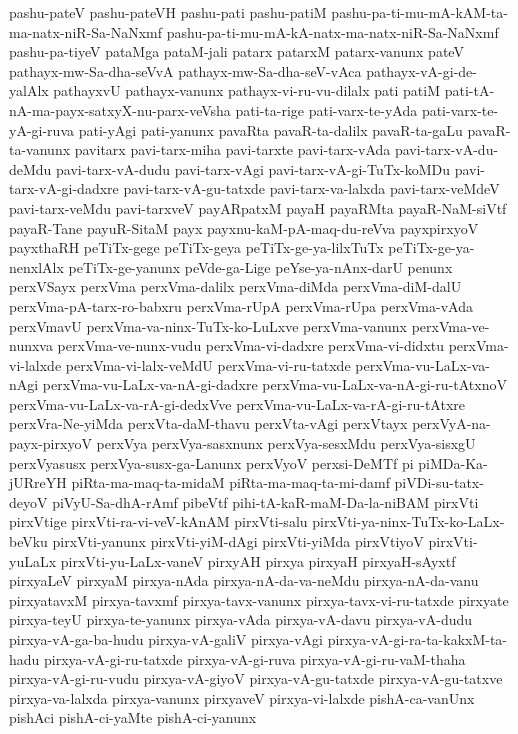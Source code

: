 {pashu-pateV
pashu-pateVH
pashu-pati
pashu-patiM
pashu-pa-ti-mu-mA-kAM-ta-ma-natx-niR-Sa-NaNxmf
pashu-pa-ti-mu-mA-kA-natx-ma-natx-niR-Sa-NaNxmf
pashu-pa-tiyeV
pataMga
pataM-jali
patarx
patarxM
patarx-vanunx
pateV
pathayx-mw-Sa-dha-seVvA
pathayx-mw-Sa-dha-seV-vAca
pathayx-vA-gi-de-yalAlx
pathayxvU
pathayx-vanunx
pathayx-vi-ru-vu-dilalx
pati
patiM
pati-tA-nA-ma-payx-satxyX-nu-parx-veVsha
pati-ta-rige
pati-varx-te-yAda
pati-varx-te-yA-gi-ruva
pati-yAgi
pati-yanunx
pavaRta
pavaR-ta-dalilx
pavaR-ta-gaLu
pavaR-ta-vanunx
pavitarx
pavi-tarx-miha
pavi-tarxte
pavi-tarx-vAda
pavi-tarx-vA-du-deMdu
pavi-tarx-vA-dudu
pavi-tarx-vAgi
pavi-tarx-vA-gi-TuTx-koMDu
pavi-tarx-vA-gi-dadxre
pavi-tarx-vA-gu-tatxde
pavi-tarx-va-lalxda
pavi-tarx-veMdeV
pavi-tarx-veMdu
pavi-tarxveV
payARpatxM
payaH
payaRMta
payaR-NaM-siVtf
payaR-Tane
payuR-SitaM
payx
payxnu-kaM-pA-maq-du-reVva
payxpirxyoV
payxthaRH
peTiTx-gege
peTiTx-geya
peTiTx-ge-ya-lilxTuTx
peTiTx-ge-ya-nenxlAlx
peTiTx-ge-yanunx
peVde-ga-Lige
peYse-ya-nAnx-darU
penunx
perxVSayx
perxVma
perxVma-dalilx
perxVma-diMda
perxVma-diM-dalU
perxVma-pA-tarx-ro-babxru
perxVma-rUpA
perxVma-rUpa
perxVma-vAda
perxVmavU
perxVma-va-ninx-TuTx-ko-LuLxve
perxVma-vanunx
perxVma-ve-nunxva
perxVma-ve-nunx-vudu
perxVma-vi-dadxre
perxVma-vi-didxtu
perxVma-vi-lalxde
perxVma-vi-lalx-veMdU
perxVma-vi-ru-tatxde
perxVma-vu-LaLx-va-nAgi
perxVma-vu-LaLx-va-nA-gi-dadxre
perxVma-vu-LaLx-va-nA-gi-ru-tAtxnoV
perxVma-vu-LaLx-va-rA-gi-dedxVve
perxVma-vu-LaLx-va-rA-gi-ru-tAtxre
perxVra-Ne-yiMda
perxVta-daM-thavu
perxVta-vAgi
perxVtayx
perxVyA-na-payx-pirxyoV
perxVya
perxVya-sasxnunx
perxVya-sesxMdu
perxVya-sisxgU
perxVyasusx
perxVya-susx-ga-Lanunx
perxVyoV
perxsi-DeMTf
pi
piMDa-Ka-jURreYH
piRta-ma-maq-ta-midaM
piRta-ma-maq-ta-mi-damf
piVDi-su-tatx-deyoV
piVyU-Sa-dhA-rAmf
pibeVtf
pihi-tA-kaR-maM-Da-la-niBAM
pirxVti
pirxVtige
pirxVti-ra-vi-veV-kAnAM
pirxVti-salu
pirxVti-ya-ninx-TuTx-ko-LaLx-beVku
pirxVti-yanunx
pirxVti-yiM-dAgi
pirxVti-yiMda
pirxVtiyoV
pirxVti-yuLaLx
pirxVti-yu-LaLx-vaneV
pirxyAH
pirxya
pirxyaH
pirxyaH-sAyxtf
pirxyaLeV
pirxyaM
pirxya-nAda
pirxya-nA-da-va-neMdu
pirxya-nA-da-vanu
pirxyatavxM
pirxya-tavxmf
pirxya-tavx-vanunx
pirxya-tavx-vi-ru-tatxde
pirxyate
pirxya-teyU
pirxya-te-yanunx
pirxya-vAda
pirxya-vA-davu
pirxya-vA-dudu
pirxya-vA-ga-ba-hudu
pirxya-vA-galiV
pirxya-vAgi
pirxya-vA-gi-ra-ta-kakxM-ta-hadu
pirxya-vA-gi-ru-tatxde
pirxya-vA-gi-ruva
pirxya-vA-gi-ru-vaM-thaha
pirxya-vA-gi-ru-vudu
pirxya-vA-giyoV
pirxya-vA-gu-tatxde
pirxya-vA-gu-tatxve
pirxya-va-lalxda
pirxya-vanunx
pirxyaveV
pirxya-vi-lalxde
pishA-ca-vanUnx
pishAci
pishA-ci-yaMte
pishA-ci-yanunx
}
